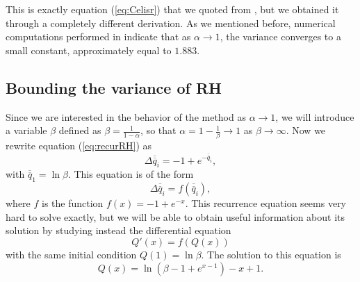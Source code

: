 \documentclass[proceedings]{aofa}
\newcommand{\tail}[1]{\overline{#1}}
\newcommand{\ttail}[1]{\tail{\tail{#1}}}
\begin{document}
This is exactly equation (\ref{eq:Celisr}) that we quoted from \cite{CelisT}, but we obtained it through a completely different derivation.
As we mentioned before, numerical computations performed in \cite{Celis} indicate that as
$\alpha \rightarrow 1$, the variance converges to a small constant, approximately equal to $1.883$.



\subsection{Bounding the variance of RH}\label{BoundingRH}

Since we are interested in the behavior of the method as $\alpha \rightarrow 1$, we will introduce a variable $\beta$ defined as $\beta=\frac{1}{1-\alpha}$, so that $\alpha=1-\frac{1}{\beta} \rightarrow 1$ as $\beta \rightarrow \infty$.
Now we rewrite equation (\ref{eq:recurRH}) as
\begin{equation}\label{eq:Deltaqi}
\Delta  \ttail{q}_i = -1 + e^{-\ttail{q}_i},
\end{equation}
with $\ttail{q}_1=\ln{\beta}$.
This equation is of the form
\begin{equation}\label{eq:Deltaqif}
\Delta  \ttail{q}_i = f(\ttail{q}_i),
\end{equation}
where $f$ is the function $f(x)=-1+e^{-x}$.
This recurrence equation seems very hard to solve exactly, but we will be able to obtain useful information about its solution by studying instead the differential equation
\begin{equation}\label{eq:diffQ}
Q'(x)=f(Q(x))
\end{equation}
with the same initial condition $Q(1)=\ln{\beta}$.
The solution to this equation is
\begin{equation}
\label{laQ}
Q(x)=\ln{(\beta-1+e^{x-1})}-x+1.
\end{equation}
\end{document}
